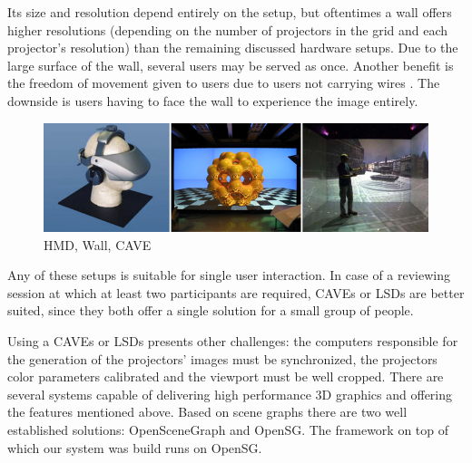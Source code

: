 \begin{description}
		Its size and resolution depend entirely on the setup, but oftentimes a wall offers higher resolutions
		(depending on the number of projectors in the grid and each projector's resolution)
		than the remaining discussed hardware setups.
		Due to the large surface of the wall, several users may be served as once.
		Another benefit is the freedom of movement given to users due to users not carrying wires \cite{INTTABLE}.
		The downside is users having to face the wall to experience the image entirely.
\end{description}

\begin{figure}[!ht]
	\centering
	\includegraphics[width=12cm]{gfx/hmd-cluster-cave.png}
	\caption{HMD, Wall, CAVE}
	\label{FIG-HMD-CLUSTER-CAVE}
\end{figure}

Any of these setups is suitable for single user interaction.
In case of a reviewing session at which at least two participants are required,
CAVEs or LSDs are better suited, since they both offer a single solution for a small group of people.

Using a CAVEs or LSDs presents other challenges:
the computers responsible for the generation of the projectors' images must be synchronized,
the projectors color parameters calibrated and the viewport must be well cropped.
There are several systems capable of delivering high performance 3D graphics and
offering the features mentioned above.
Based on scene graphs there are two well established solutions:
OpenSceneGraph\cite{SITE-OSG} and OpenSG\cite{SITE-OPENSG}.
The framework on top of which our system was build runs on OpenSG.